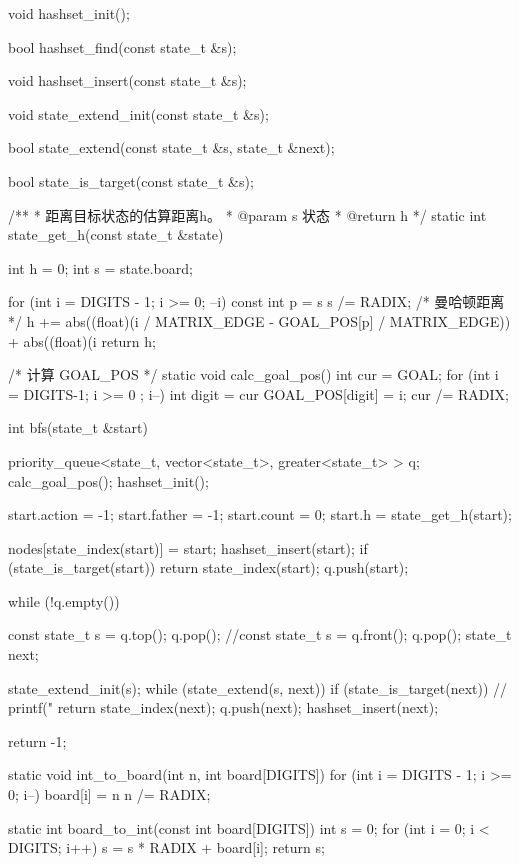 \begin{Codex}[label=eight_digits_astar.c]
void hashset_init();

bool hashset_find(const state_t &s);

void hashset_insert(const state_t &s);

void state_extend_init(const state_t &s);

bool state_extend(const state_t &s, state_t &next);

bool state_is_target(const state_t &s);

/**
 * 距离目标状态的估算距离h。
 * @param s 状态
 * @return h
 */
static int state_get_h(const state_t &state) {
    int h = 0;
    int s = state.board;

    for (int i = DIGITS - 1; i >= 0; --i) {
        const int p = s %
        s /= RADIX;
        /* 曼哈顿距离 */
        h += abs((float)(i / MATRIX_EDGE - GOAL_POS[p] / MATRIX_EDGE)) +
                abs((float)(i %
    }
    return h;
}

/* 计算 GOAL_POS */
static void calc_goal_pos() {
    int cur = GOAL;
    for (int i = DIGITS-1; i >= 0 ; i--) {
        int digit = cur %
        GOAL_POS[digit] = i;
        cur /= RADIX;
    }
}

int bfs(state_t &start) {
    priority_queue<state_t, vector<state_t>,
                                 greater<state_t> > q;
    calc_goal_pos();
    hashset_init();

    start.action = -1;
    start.father = -1;
    start.count = 0;
    start.h = state_get_h(start);

    nodes[state_index(start)] = start;
    hashset_insert(start);
    if (state_is_target(start))
        return state_index(start);
    q.push(start);

    while (!q.empty()) {
        const state_t s = q.top(); q.pop();
        //const state_t s = q.front(); q.pop();
        state_t next;

        state_extend_init(s);
        while (state_extend(s, next)) {
            if (state_is_target(next)) {
                // printf("%
                return state_index(next);
            }
            q.push(next);
            hashset_insert(next);
        }
    }
    return -1;
}

static void int_to_board(int n, int board[DIGITS]) {
    for (int i = DIGITS - 1; i >= 0; i--) {
        board[i] = n %
        n /= RADIX;
    }
}

static int board_to_int(const int board[DIGITS]) {
    int s = 0;
    for (int i = 0; i < DIGITS; i++)
        s = s * RADIX + board[i];
    return s;
}


\end{Codex}
